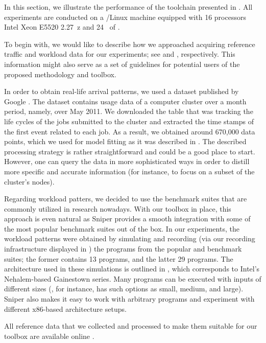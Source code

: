 In this section, we illustrate the performance of the toolchain presented in
. All experiments are conducted on a /Linux machine
equipped with 16 processors Intel Xeon E5520 2.27~z and 24~ of
.

To begin with, we would like to describe how we approached acquiring reference
traffic and workload data for our experiments; see  and
, respectively. This information might also serve as a set of
guidelines for potential users of the proposed methodology and toolbox.

In order to obtain real-life arrival patterns, we used a dataset published by
Google \cite{google}. The dataset contains usage data of a computer cluster over
a month period, namely, over May 2011. We downloaded the table that was tracking
the life cycles of the jobs submitted to the cluster and extracted the time
stamps of the first event related to each job. As a result, we obtained around
670,000 data points, which we used for model fitting as it was described in
. The described processing strategy is rather straightforward and
could be a good place to start. However, one can query the data in more
sophisticated ways in order to distill more specific and accurate information
(for instance, to focus on a subset of the cluster's nodes).


Regarding workload patters, we decided to use the benchmark suites that are
commonly utilized in research nowadays. With our toolbox in place, this approach
is even natural as Sniper provides a smooth integration with some of the most
popular benchmark suites out of the box. In our experiments, the workload
patterns were obtained by simulating and recording (via our recording
infrastructure displayed in ) the programs from the popular
 \cite{bienia2011} and  \cite{cpu2006} benchmark
suites; the former contains 13 programs, and the latter 29 programs. The
architecture used in these simulations is outlined in , which
corresponds to Intel's Nehalem-based Gainestown series. Many programs can be
executed with inputs of different sizes (, for instance, has such
options as small, medium, and large). Sniper also makes it easy to work with
arbitrary programs and experiment with different x86-based architecture setups.

All reference data that we collected and processed to make them suitable for our
toolbox are available online \cite{sources}.

